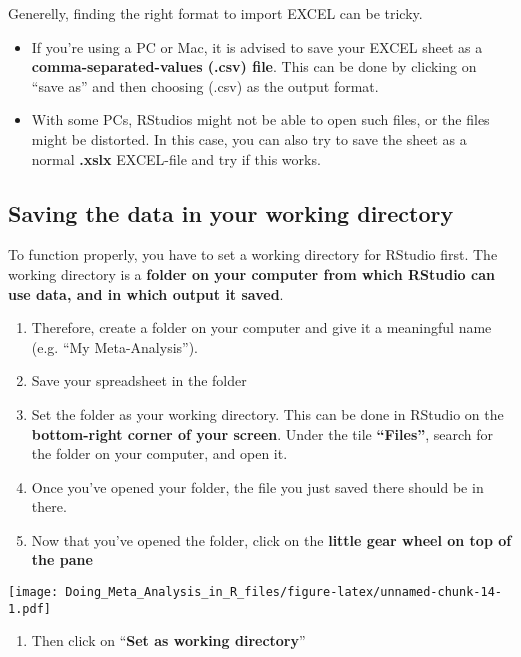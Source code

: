 \documentclass[]{book}
\providecommand{\tightlist}{%
  \setlength{\itemsep}{0pt}\setlength{\parskip}{0pt}}
\theoremstyle{definition}
\theoremstyle{definition}
\theoremstyle{definition}
\theoremstyle{remark}
\begin{document}
Generelly, finding the right format to import EXCEL can be tricky.

\begin{itemize}
\tightlist
\item
  If you're using a PC or Mac, it is advised to save your EXCEL sheet as
  a \textbf{comma-separated-values (.csv) file}. This can be done by
  clicking on ``save as'' and then choosing (.csv) as the output format.
\item
  With some PCs, RStudios might not be able to open such files, or the
  files might be distorted. In this case, you can also try to save the
  sheet as a normal \textbf{.xslx} EXCEL-file and try if this works.
\end{itemize}

\subsection{Saving the data in your working
directory}\label{saving-the-data-in-your-working-directory}

To function properly, you have to set a working directory for RStudio
first. The working directory is a \textbf{folder on your computer from
which RStudio can use data, and in which output it saved}.

\begin{enumerate}
\def\labelenumi{\arabic{enumi}.}
\tightlist
\item
  Therefore, create a folder on your computer and give it a meaningful
  name (e.g. ``My Meta-Analysis'').
\item
  Save your spreadsheet in the folder
\item
  Set the folder as your working directory. This can be done in RStudio
  on the \textbf{bottom-right corner of your screen}. Under the tile
  \textbf{``Files''}, search for the folder on your computer, and open
  it.
\item
  Once you've opened your folder, the file you just saved there should
  be in there.
\item
  Now that you've opened the folder, click on the \textbf{little gear
  wheel on top of the pane}
\end{enumerate}

\texttt{[image: Doing\_Meta\_Analysis\_in\_R\_files/figure-latex/unnamed-chunk-14-1.pdf]}

\begin{enumerate}
\def\labelenumi{\arabic{enumi}.}
\setcounter{enumi}{5}
\tightlist
\item
  Then click on ``\textbf{Set as working directory}''
\end{enumerate}
\end{document}
